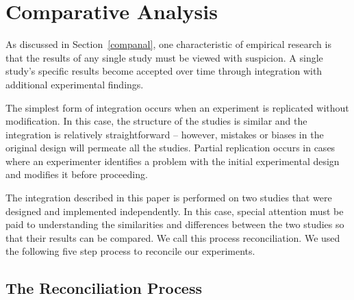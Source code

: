 \section{Comparative Analysis}
\label{joint}

As discussed in Section~\ref{companal}, one characteristic of empirical
research is that the results of any single study must be viewed with
suspicion. A single study's specific results become accepted over time
through integration with additional experimental findings.

The simplest form of integration occurs when an experiment is replicated
without modification. In this case, the structure of the studies is similar
and the integration is relatively straightforward -- however, mistakes or
biases in the original design will permeate all the studies.  Partial
replication occurs in cases where an experimenter identifies a problem with
the initial experimental design and modifies it before proceeding.

The integration described in this paper is performed on two studies that
were designed and implemented independently.  In this case, special
attention must be paid to understanding the similarities and differences
between the two studies so that their results can be compared. We call this
process reconciliation. We used the following five step process to
reconcile our experiments.

\subsection{The Reconciliation Process}

